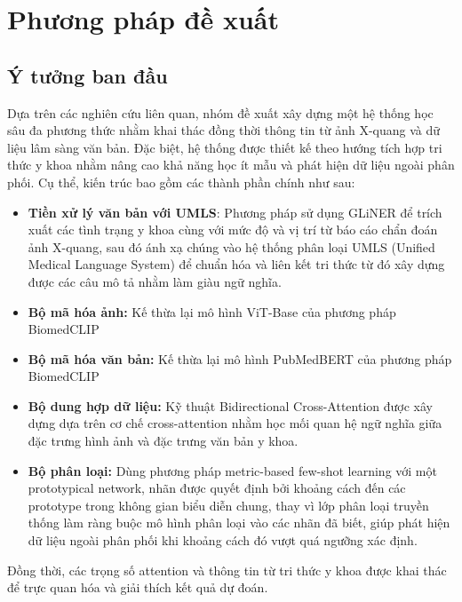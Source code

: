 \chapter{Phương pháp đề xuất}
\label{Chapter3}

\section{Ý tưởng ban đầu} 

Dựa trên các nghiên cứu liên quan, nhóm đề xuất xây dựng một hệ thống học sâu đa phương thức nhằm khai thác đồng thời thông tin từ ảnh X-quang và dữ liệu lâm sàng văn bản. Đặc biệt, hệ thống được thiết kế theo hướng tích hợp tri thức y khoa nhằm nâng cao khả năng học ít mẫu và phát hiện dữ liệu ngoài phân phối. Cụ thể, kiến trúc bao gồm các thành phần chính như sau:
    \begin{itemize}
        \item \textbf{Tiền xử lý văn bản với UMLS}: Phương pháp sử dụng GLiNER để trích xuất các tình trạng y khoa cùng với mức độ và vị trí từ báo cáo chẩn đoán ảnh X-quang, sau đó ánh xạ chúng vào hệ thống phân loại UMLS (Unified Medical Language System) để chuẩn hóa và liên kết tri thức từ đó xây dựng được các câu mô tả nhằm làm giàu ngữ nghĩa.
        \item \textbf{Bộ mã hóa ảnh:} Kế thừa lại mô hình ViT-Base của phương pháp BiomedCLIP \cite{BiomedCLIP}
        \item \textbf{Bộ mã hóa văn bản:} Kế thừa lại mô hình PubMedBERT của phương pháp BiomedCLIP \cite{BiomedCLIP}
        \item \textbf{Bộ dung hợp dữ liệu:} Kỹ thuật Bidirectional Cross-Attention được xây dựng dựa trên cơ chế cross-attention 
        nhằm học mối quan hệ ngữ nghĩa giữa đặc trưng hình ảnh và đặc trưng văn bản y khoa.
        \item \textbf{Bộ phân loại:} Dùng phương pháp metric-based few-shot learning với một prototypical network, nhãn được quyết định bởi khoảng cách
         đến các prototype trong không gian biểu diễn chung, 
        thay vì lớp phân loại truyền thống làm ràng buộc mô hình phân loại vào các nhãn đã biết, 
        giúp phát hiện dữ liệu ngoài phân phối khi khoảng cách đó vượt quá ngưỡng xác định.

    \end{itemize}
    Đồng thời, các trọng số attention và thông tin từ tri thức y khoa được khai thác để trực quan hóa và giải thích kết quả dự đoán.

